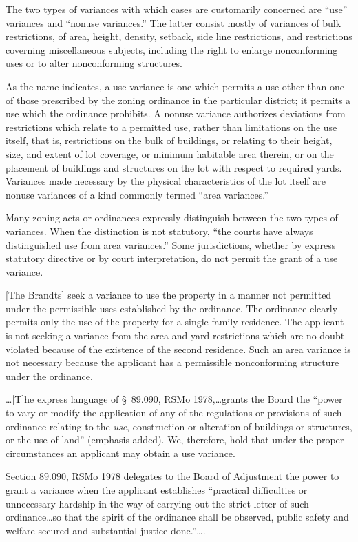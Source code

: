 The two types of variances with which cases are customarily concerned are
``use'' variances and ``nonuse variances.'' The latter consist mostly of
variances of bulk restrictions, of area, height, density, setback, side line
restrictions, and restrictions coverning miscellaneous subjects, including the
right to enlarge nonconforming uses or to alter nonconforming structures.

As the name indicates, a use variance is one which permits a use other than one
of those prescribed by the zoning ordinance in the particular district; it
permits a use which the ordinance prohibits. A nonuse variance authorizes
deviations from restrictions which relate to a permitted use, rather than
limitations on the use itself, that is, restrictions on the bulk of buildings,
or relating to their height, size, and extent of lot coverage, or minimum
habitable area therein, or on the placement of buildings and structures on the
lot with respect to required yards. Variances made necessary by the physical
characteristics of the lot itself are nonuse variances of a kind commonly termed
``area variances.''

Many zoning acts or ordinances expressly distinguish between the two types of
variances. When the distinction is not statutory, ``the courts have always
distinguished use from area variances.'' Some jurisdictions, whether by express
statutory directive or by court interpretation, do not permit the grant of a use
variance. 

[The Brandts] seek a variance to use the property in a manner not permitted
under the permissible uses established by the ordinance. The ordinance clearly
permits only the use of the property for a single family residence. The
applicant is not seeking a variance from the area and yard restrictions which
are no doubt violated because of the existence of the second residence. Such an
area variance is not necessary because the applicant has a permissible
nonconforming structure under the ordinance. 

\ldots [T]he express language of \S~89.090, RSMo 1978,\ldots grants the Board
the ``power to vary or modify the application of any of the regulations or
provisions of such ordinance relating to the \textit{use}, construction or
alteration of buildings or structures, or the use of land'' (emphasis added).
We, therefore, hold that under the proper circumstances an applicant may obtain
a use variance. 

Section 89.090, RSMo 1978 delegates to the Board of Adjustment the power to
grant a variance when the applicant establishes ``practical difficulties or
unnecessary hardship in the way of carrying out the strict letter of such
ordinance\ldots so that the spirit of the ordinance shall be observed, public
safety and welfare secured and substantial justice done.''\ldots.

